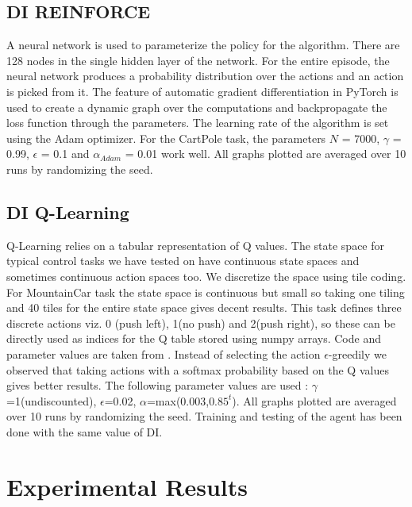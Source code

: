\documentclass{article}
\begin{document}
\subsection{DI REINFORCE}
A neural network is used to parameterize the policy for the algorithm. There are 128 nodes in the single hidden layer of the network. For the entire episode, the neural network produces a probability distribution over the actions and an action is picked from it. The feature of automatic gradient differentiation in PyTorch is used to create a dynamic graph over the computations and backpropagate the loss function through the parameters. The learning rate of the algorithm is set using the Adam optimizer. For the CartPole task, the parameters $N$ = 7000, $\gamma$ = 0.99, $\epsilon$ = 0.1 and $\alpha_{Adam}$ = 0.01 work well. All graphs plotted are averaged over 10 runs by randomizing the seed.

\subsection{DI Q-Learning}

Q-Learning relies on a tabular representation of Q values. The state space for typical control tasks we have tested on have continuous state spaces and sometimes continuous action spaces too. We discretize the space using tile coding. For MountainCar task the state space is continuous but small so taking one tiling and 40 tiles for the entire state space gives decent results. This task defines three discrete actions viz. 0 (push left), 1(no push) and 2(push right), so these can be directly used as indices for the Q table stored using numpy arrays. Code and parameter values  are taken from \citet{malzantot}. Instead of selecting the action $\epsilon$-greedily we observed that taking actions with a softmax probability based on the Q values gives better results. The following parameter values are used : $\gamma$=1(undiscounted), $\epsilon$=0.02, $\alpha$=max(0.003,$0.85^t$). All graphs plotted are averaged over 10 runs by randomizing the seed. Training and testing of the agent has been done with the same value of DI.

\section{Experimental Results}
\end{document}

